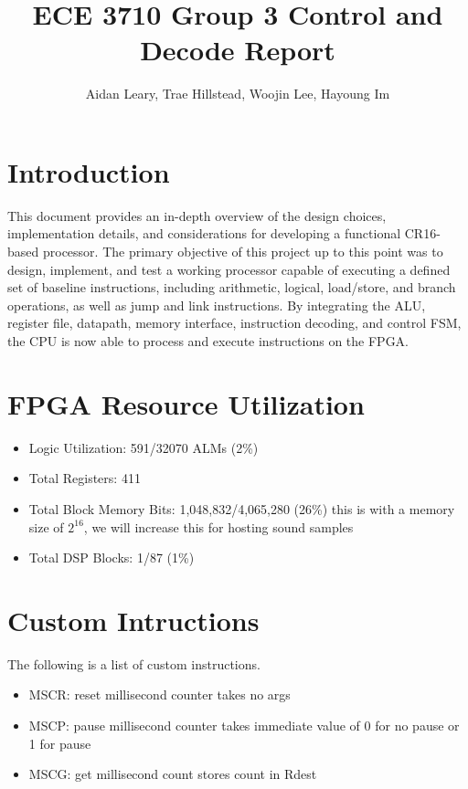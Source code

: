 \documentclass[10pt, portrait, letterpaper]{article}
\title{ECE 3710 Group 3 Control and Decode Report}
\author{Aidan Leary, Trae Hillstead, Woojin Lee, Hayoung Im}
\begin{document}
  \maketitle

  \section{Introduction} 
  This document provides an in-depth overview of the design choices, implementation details, and considerations for developing a functional CR16-based processor. The primary objective of this project up to this point was to design, implement, and test a working processor capable of executing a defined set of baseline instructions, including arithmetic, logical, load/store, and branch operations, as well as jump and link instructions. By integrating the ALU, register file, datapath, memory interface, instruction decoding, and control FSM, the CPU is now able to process and execute instructions on the FPGA.

  \section{FPGA Resource Utilization}
  \begin{itemize} 
    \item Logic Utilization: 591/32070 ALMs (2\%)
    \item Total Registers: 411 
    \item Total Block Memory Bits: 1,048,832/4,065,280 (26\%)  
      \subitem this is with a memory size of $2^{16}$, we will increase this for hosting sound samples
    \item Total DSP Blocks: 1/87 (1\%)
  \end{itemize}

  \section{Custom Intructions} 
  The following is a list of custom instructions.
  \begin{itemize} 
    \item MSCR: reset millisecond counter 
      \subitem takes no args
    \item MSCP: pause millisecond counter 
      \subitem takes immediate value of 0 for no pause or 1 for pause
    \item MSCG: get millisecond count
      \subitem stores count in Rdest
  \end{itemize}
\end{document}
